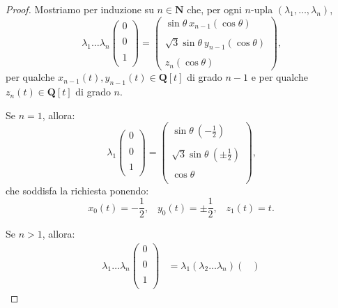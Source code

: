 \documentclass[a4paper,oneside,11pt]{book}
\theoremstyle{definition} \newtheorem{Def}{Definizione}
\theoremstyle{plain} \newtheorem{teo}{Teorema}
\theoremstyle{plain} \newtheorem{cor}[teo]{Corollario}
\theoremstyle{definition} \newtheorem{lem}[teo]{Lemma}
\theoremstyle{plain} \newtheorem{pro}[teo]{Proposizione}
\begin{document}
\begin{proof}
		Mostriamo per induzione su $n \in \mathbf{N}$ che, per ogni $n$-upla $(\lambda_1, \dots, \lambda_n)$,
		\begin{equation*}
			\lambda_1 \dots \lambda_n \begin{pmatrix}
				0 \\ \\
				0 \\ \\
				1 \\
			\end{pmatrix} = \begin{pmatrix}
				\sin \theta \ x_{n-1}(\cos \theta)\\ 	\\
				\sqrt{3} \sin \theta \ y_{n-1}(\cos \theta) \\ \\
				z_n(\cos \theta)
			\end{pmatrix} \text{,}
		\end{equation*}
		per qualche $x_{n-1}(t), y_{n-1}(t) \in \mathbf{Q}[t]$ di grado $n-1$ e per qualche $z_n(t) \in \mathbf{Q}[t]$ di grado $n$.
		
		Se $n=1$, allora:
		\begin{equation*}
			\lambda_1 \begin{pmatrix}

				0 \\ \\
				0 \\ \\
				1 \\
			\end{pmatrix} = \begin{pmatrix}
				\sin \theta\ (-\frac{1}{2}) \\ \\
				\sqrt{3} \sin \theta\ (\pm\frac{1}{2}) \\ \\
				\cos \theta \\
			\end{pmatrix} \text{,}
		\end{equation*}
		che soddisfa la richiesta ponendo:
		\begin{equation*}
			x_0(t) = -\frac{1}{2} \text{,}\quad y_0(t) = \pm \frac{1}{2} \text{,}\quad z_1(t) = t \text{.}
		\end{equation*} 
		
		Se $n>1$, allora:
		\begin{equation*}
		\begin{aligned}
			\lambda_1 \dots \lambda_n \begin{pmatrix}
				0 \\ \\
				0 \\ \\
				1 \\
			\end{pmatrix} &= \lambda_1 (\lambda_2 \dots \lambda_n) \begin{pmatrix}


\end{pmatrix}
\end{aligned}
\end{equation*}
\end{proof}
\end{document}
